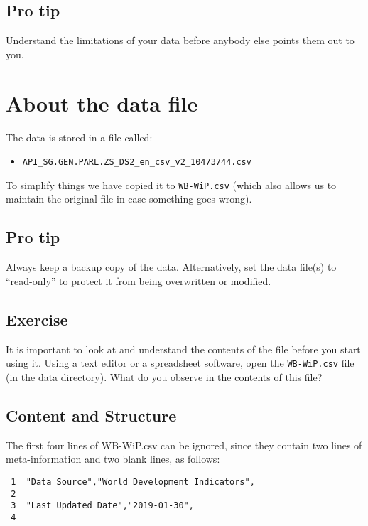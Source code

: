 \documentclass[a4paper,9pt,twocolumn,twoside,printwatermark=true]{pinp}
\providecommand{\tightlist}{%
  \setlength{\itemsep}{0pt}\setlength{\parskip}{0pt}}
\begin{document}
\subsection{Pro tip}\label{pro-tip}

Understand the limitations of your data before anybody else points them
out to you.

\section{About the data file}\label{about-the-data-file}

The data is stored in a file called:

\begin{itemize}
\tightlist
\item
  \texttt{API\_SG.GEN.PARL.ZS\_DS2\_en\_csv\_v2\_10473744.csv}
\end{itemize}

To simplify things we have copied it to \texttt{WB-WiP.csv} (which also
allows us to maintain the original file in case something goes wrong).

\subsection{Pro tip}\label{pro-tip-1}

Always keep a backup copy of the data. Alternatively, set the data
file(s) to ``read-only'' to protect it from being overwritten or
modified.

\subsection{Exercise}\label{exercise}

It is important to look at and understand the contents of the file
before you start using it. Using a text editor or a spreadsheet
software, open the \texttt{WB-WiP.csv} file (in the data directory).
What do you observe in the contents of this file?

\subsection{Content and Structure}\label{content-and-structure}

The first four lines of WB-WiP.csv can be ignored, since they contain
two lines of meta-information and two blank lines, as follows:

\begin{verbatim}
 1  ﻿"Data Source","World Development Indicators",
 2  
 3  "Last Updated Date","2019-01-30",
 4  
\end{verbatim}
\end{document}
